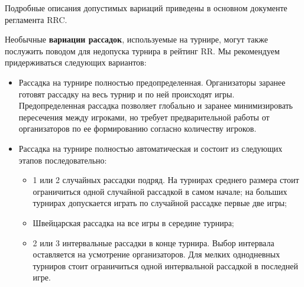 Подробные описания допустимых вариаций приведены в основном документе регламента RRC.

Необычные \textbf{вариации рассадок}, используемые на турнире, могут также послужить поводом для недопуска турнира в рейтинг RR. Мы рекомендуем придерживаться следующих вариантов:
\begin{itemize}
	\item Рассадка на турнире полностью предопределенная. Организаторы заранее готовят рассадку на весь турнир и по ней происходят игры. Предопределенная рассадка позволяет глобально и заранее минимизировать пересечения между игроками, но требует предварительной работы от организаторов по ее формированию согласно количеству игроков.
	\item Рассадка на турнире полностью автоматическая и состоит из следующих этапов последовательно:
	\begin{itemize}
		\item 1 или 2 случайных рассадки подряд. На турнирах среднего размера стоит ограничиться одной случайной рассадкой в самом начале; на больших турнирах допускается играть по случайной рассадке первые две игры;
		\item Швейцарская рассадка на все игры в середине турнира;
		\item 2 или 3 интервальные рассадки в конце турнира. Выбор интервала оставляется на усмотрение организаторов. Для мелких однодневных турниров стоит ограничиться одной интервальной рассадкой в последней игре.
	\end{itemize}
\end{itemize}
